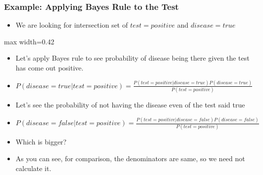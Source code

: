 \begin{frame}[fragile]\frametitle{Example: Applying Bayes Rule to the Test}

\begin{itemize}
\item We are looking for intersection set of $test=positive$ and $disease = true$
\end{itemize}

\begin{center}
\begin{adjustbox}{max width=0.42\linewidth}
\end{adjustbox}
\end{center}

\begin{itemize}
\item Let’s apply Bayes rule to see probability of disease being there given the test has come out positive.
\item $P(disease=true|test=positive) = \frac{P(test=positive | disease=true)P(disease=true)}{P(test=positive)}$
\item Let’s see the probability of not having the disease even of the test said true
\item $P(disease=false|test=positive) = \frac{P(test=positive | disease=false)P(disease=false)}{P(test=positive)}$
\item Which is bigger?
\item As you can see, for comparison, the denominators are same, so we need not calculate it.

\end{itemize}

\end{frame}


